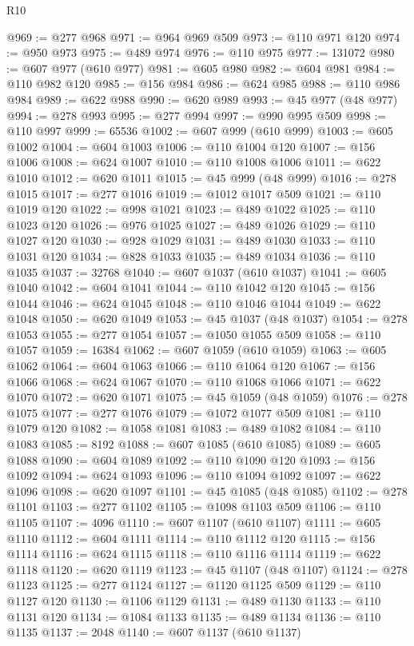 \begin{lexlean}{R10}
\begin{coremodule}
@969 := @277 @968
@971 := @964 @969 @509
@973 := @110 @971 @120
@974 := @950 @973
@975 := @489 @974
@976 := @110 @975
@977 := 131072
@980 := @607 @977 (@610 @977)
@981 := @605 @980
@982 := @604 @981
@984 := @110 @982 @120
@985 := @156 @984
@986 := @624 @985
@988 := @110 @986 @984
@989 := @622 @988
@990 := @620 @989
@993 := @45 @977 (@48 @977)
@994 := @278 @993
@995 := @277 @994
@997 := @990 @995 @509
@998 := @110 @997
@999 := 65536
@1002 := @607 @999 (@610 @999)
@1003 := @605 @1002
@1004 := @604 @1003
@1006 := @110 @1004 @120
@1007 := @156 @1006
@1008 := @624 @1007
@1010 := @110 @1008 @1006
@1011 := @622 @1010
@1012 := @620 @1011
@1015 := @45 @999 (@48 @999)
@1016 := @278 @1015
@1017 := @277 @1016
@1019 := @1012 @1017 @509
@1021 := @110 @1019 @120
@1022 := @998 @1021
@1023 := @489 @1022
@1025 := @110 @1023 @120
@1026 := @976 @1025
@1027 := @489 @1026
@1029 := @110 @1027 @120
@1030 := @928 @1029
@1031 := @489 @1030
@1033 := @110 @1031 @120
@1034 := @828 @1033
@1035 := @489 @1034
@1036 := @110 @1035
@1037 := 32768
@1040 := @607 @1037 (@610 @1037)
@1041 := @605 @1040
@1042 := @604 @1041
@1044 := @110 @1042 @120
@1045 := @156 @1044
@1046 := @624 @1045
@1048 := @110 @1046 @1044
@1049 := @622 @1048
@1050 := @620 @1049
@1053 := @45 @1037 (@48 @1037)
@1054 := @278 @1053
@1055 := @277 @1054
@1057 := @1050 @1055 @509
@1058 := @110 @1057
@1059 := 16384
@1062 := @607 @1059 (@610 @1059)
@1063 := @605 @1062
@1064 := @604 @1063
@1066 := @110 @1064 @120
@1067 := @156 @1066
@1068 := @624 @1067
@1070 := @110 @1068 @1066
@1071 := @622 @1070
@1072 := @620 @1071
@1075 := @45 @1059 (@48 @1059)
@1076 := @278 @1075
@1077 := @277 @1076
@1079 := @1072 @1077 @509
@1081 := @110 @1079 @120
@1082 := @1058 @1081
@1083 := @489 @1082
@1084 := @110 @1083
@1085 := 8192
@1088 := @607 @1085 (@610 @1085)
@1089 := @605 @1088
@1090 := @604 @1089
@1092 := @110 @1090 @120
@1093 := @156 @1092
@1094 := @624 @1093
@1096 := @110 @1094 @1092
@1097 := @622 @1096
@1098 := @620 @1097
@1101 := @45 @1085 (@48 @1085)
@1102 := @278 @1101
@1103 := @277 @1102
@1105 := @1098 @1103 @509
@1106 := @110 @1105
@1107 := 4096
@1110 := @607 @1107 (@610 @1107)
@1111 := @605 @1110
@1112 := @604 @1111
@1114 := @110 @1112 @120
@1115 := @156 @1114
@1116 := @624 @1115
@1118 := @110 @1116 @1114
@1119 := @622 @1118
@1120 := @620 @1119
@1123 := @45 @1107 (@48 @1107)
@1124 := @278 @1123
@1125 := @277 @1124
@1127 := @1120 @1125 @509
@1129 := @110 @1127 @120
@1130 := @1106 @1129
@1131 := @489 @1130
@1133 := @110 @1131 @120
@1134 := @1084 @1133
@1135 := @489 @1134
@1136 := @110 @1135
@1137 := 2048
@1140 := @607 @1137 (@610 @1137)

\end{coremodule}
\end{lexlean}

